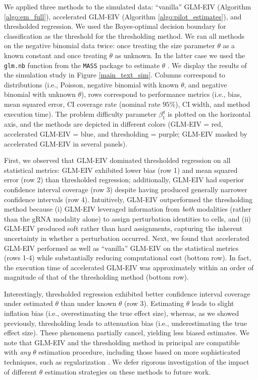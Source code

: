 \documentclass[12pt]{article}
\begin{document}
We applied three methods to the simulated data: ``vanilla'' GLM-EIV (Algorithm \ref{algo:em_full}), accelerated GLM-EIV (Algorithm \ref{algo:pilot_estimates}), and thresholded regression. We used the Bayes-optimal decision boundary for classification as the threshold for the thresholding method. We ran all methods on the negative binomial data twice: once treating the size parameter $\theta$ as a known constant and once treating $\theta$ as unknown. In the latter case we used the \texttt{glm.nb} function from the \texttt{MASS} package to estimate $\theta$ \cite{Ripley2013}. We display the results of the simulation study in Figure \ref{main_text_sim}. Columns correspond to distributions (i.e., Poisson, negative binomial with known $\theta$, and negative binomial with unknown $\theta$), rows correspond to performance metrics (i.e., bias, mean squared error, CI coverage rate (nominal rate $95\%$), CI width, and method execution time). The problem difficulty parameter $\beta^g_1$ is plotted on the horizontal axis, and the methods are depicted in different colors (GLM-EIV = red, accelerated GLM-EIV = blue, and thresholding = purple; GLM-EIV masked by accelerated GLM-EIV in several panels).

First, we observed that GLM-EIV dominated thresholded regression on all statistical metrics: GLM-EIV exhibited lower bias (row 1) and mean squared error (row 2) than thresholded regression; additionally, GLM-EIV had superior confidence interval coverage (row 3) despite having produced generally narrower confidence intervals (row 4). Intuitively, GLM-EIV outperformed the thresholding method because (i) GLM-EIV leveraged information from \textit{both} modalities (rather than the gRNA modality alone) to assign perturbation identities to cells, and (ii) GLM-EIV produced soft rather than hard assignments, capturing the inherent uncertainty in whether a perturbation occurred. Next, we found that accelerated GLM-EIV performed as well as ``vanilla'' GLM-EIV on the statistical metrics (rows 1-4) while substantially reducing computational cost (bottom row). In fact, the execution time of accelerated GLM-EIV was approximately within an order of magnitude of that of the thresholding method (bottom row).

Interestingly, thresholded regression exhibited better confidence interval coverage under estimated $\theta$ than under known $\theta$ (row 3). Estimating $\theta$ leads to slight inflation bias (i.e., overestimating the true effect size), whereas, as we showed previously, thresholding leads to attenuation bias (i.e., underestimating the true effect size). These phenomena partially cancel, yielding less biased estimates. We note that GLM-EIV and the thresholding method in principal are compatible with \textit{any} $\theta$ estimation procedure, including those based on more sophisticated techniques, such as regularization \cite{Hafemeister2019}. We defer rigorous investigation of the impact of different $\theta$ estimation strategies on these methods to future work.
\end{document}
